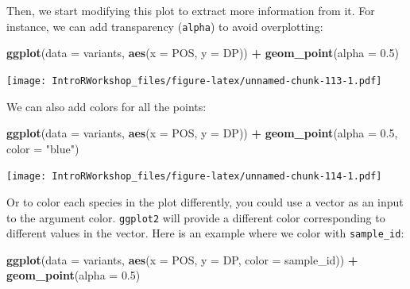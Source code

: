 \documentclass[]{book}
\newenvironment{Shaded}{\begin{snugshade}}{\end{snugshade}}
\newcommand{\DataTypeTok}[1]{\textcolor[rgb]{0.13,0.29,0.53}{#1}}
\newcommand{\FloatTok}[1]{\textcolor[rgb]{0.00,0.00,0.81}{#1}}
\newcommand{\KeywordTok}[1]{\textcolor[rgb]{0.13,0.29,0.53}{\textbf{#1}}}
\newcommand{\NormalTok}[1]{#1}
\newcommand{\OperatorTok}[1]{\textcolor[rgb]{0.81,0.36,0.00}{\textbf{#1}}}
\newcommand{\StringTok}[1]{\textcolor[rgb]{0.31,0.60,0.02}{#1}}
\begin{document}
Then, we start modifying this plot to extract more information from it. For instance, we can add transparency (\texttt{alpha}) to avoid overplotting:

\begin{Shaded}
\begin{Highlighting}[]
\KeywordTok{ggplot}\NormalTok{(}\DataTypeTok{data =}\NormalTok{ variants, }\KeywordTok{aes}\NormalTok{(}\DataTypeTok{x =}\NormalTok{ POS, }\DataTypeTok{y =}\NormalTok{ DP)) }\OperatorTok{+}
\StringTok{    }\KeywordTok{geom_point}\NormalTok{(}\DataTypeTok{alpha =} \FloatTok{0.5}\NormalTok{)}
\end{Highlighting}
\end{Shaded}

\texttt{[image: IntroRWorkshop\_files/figure-latex/unnamed-chunk-113-1.pdf]}

We can also add colors for all the points:

\begin{Shaded}
\begin{Highlighting}[]
\KeywordTok{ggplot}\NormalTok{(}\DataTypeTok{data =}\NormalTok{ variants, }\KeywordTok{aes}\NormalTok{(}\DataTypeTok{x =}\NormalTok{ POS, }\DataTypeTok{y =}\NormalTok{ DP)) }\OperatorTok{+}
\StringTok{  }\KeywordTok{geom_point}\NormalTok{(}\DataTypeTok{alpha =} \FloatTok{0.5}\NormalTok{, }\DataTypeTok{color =} \StringTok{"blue"}\NormalTok{)}
\end{Highlighting}
\end{Shaded}

\texttt{[image: IntroRWorkshop\_files/figure-latex/unnamed-chunk-114-1.pdf]}

Or to color each species in the plot differently, you could use a vector as an input to the argument color. \texttt{ggplot2} will provide a different color corresponding to different values in the vector. Here is an example where we color with \texttt{sample\_id}:

\begin{Shaded}
\begin{Highlighting}[]
\KeywordTok{ggplot}\NormalTok{(}\DataTypeTok{data =}\NormalTok{ variants, }\KeywordTok{aes}\NormalTok{(}\DataTypeTok{x =}\NormalTok{ POS, }\DataTypeTok{y =}\NormalTok{ DP, }\DataTypeTok{color =}\NormalTok{ sample_id)) }\OperatorTok{+}\StringTok{ }
\StringTok{  }\KeywordTok{geom_point}\NormalTok{(}\DataTypeTok{alpha =} \FloatTok{0.5}\NormalTok{)}
\end{Highlighting}
\end{Shaded}
\end{document}
